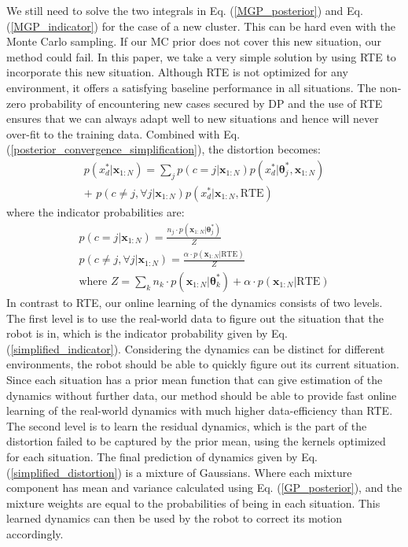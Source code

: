 \documentclass[journal]{IEEEtran}
\begin{document}
We still need to solve the two integrals in Eq. (\ref{MGP_posterior}) and Eq. (\ref{MGP_indicator}) for the case of a new cluster.
This can be hard even with the Monte Carlo sampling. 
If our MC prior does not cover this new situation, our method could fail.
In this paper, we take a very simple solution by using RTE to incorporate this new situation.
Although RTE is not optimized for any environment, it offers a satisfying baseline performance in all situations.
The non-zero probability of encountering new cases secured by DP and the use of RTE ensures that we can always adapt well to new situations and hence will never over-fit to the training data.
Combined with Eq. (\ref{posterior_convergence_simplification}), the distortion becomes:
\begin{equation}
\begin{gathered}
p(x^*_d|\bm{x}_{1:N}) 
= \sum_j p(c=j| \bm{x}_{1:N}) p(x^*_d|\bm{\theta}^*_j, \bm{x}_{1:N})
\\
+ \,\, p(c \neq j, \forall j|\bm{x}_{1:N})  p(x^*_d|\bm{x}_{1:N}, \text{RTE})
\end{gathered}
\label{simplified_distortion}
\end{equation}
where the indicator probabilities are:
\begin{equation}
\begin{gathered}
p(c=j| \bm{x}_{1:N}) 
= \frac{n_j \cdot p(\bm{x}_{1:N}|\bm{\theta}^*_j)
}{Z}
\\ 
p(c \neq j, \forall j| \bm{x}_{1:N})
= \frac{\alpha \cdot p(\bm{x}_{1:N}|\text{RTE})
}{Z}
\\ \text{where }
Z = \sum_k n_k \cdot p(\bm{x}_{1:N}|\bm{\theta}^*_k) + \alpha \cdot p(\bm{x}_{1:N}|\text{RTE})
\end{gathered}
\label{simplified_indicator}
\end{equation}
In contrast to RTE, our online learning of the dynamics consists of two levels.
The first level is to use the real-world data to figure out the situation that the robot is in, which is the indicator probability given by Eq. (\ref{simplified_indicator}).
Considering the dynamics can be distinct for different environments, the robot should be able to quickly figure out its current situation.
Since each situation has a prior mean function that can give estimation of the dynamics without further data, our method should be able to provide fast online learning of the real-world dynamics with much higher data-efficiency than RTE.
The second level is to learn the residual dynamics, which is the part of the distortion failed to be captured by the prior mean, using the kernels optimized for each situation.
The final prediction of dynamics given by Eq. (\ref{simplified_distortion}) is a mixture of Gaussians.
Where each mixture component has mean and variance calculated using Eq. (\ref{GP_posterior}), and the mixture weights are equal to the probabilities of being in each situation.
This learned dynamics can then be used by the robot to correct its motion accordingly.
\end{document}
